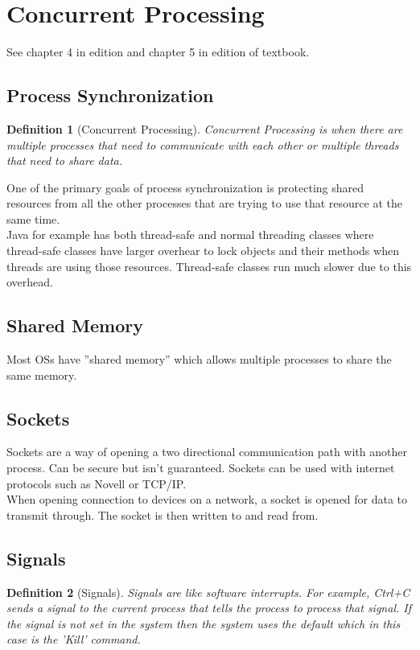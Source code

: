 \documentclass{report}
\newtheorem*{defn}{Definition}
\begin{document}
\section*{Concurrent Processing}
See chapter 4 in  edition and chapter 5 in  edition of textbook.\\

\subsection*{Process Synchronization}
\begin{defn}[Concurrent Processing] Concurrent Processing is when there are multiple processes that need to communicate with each other or multiple threads that need to share data.
\end{defn}
\noindent
One of the primary goals of process synchronization is protecting shared resources from all the other processes that are trying to use that resource at the same time.\\

Java for example has both thread-safe and normal threading classes where thread-safe classes have larger overhear to lock objects and their methods when threads are using those resources. Thread-safe classes run much slower due to this overhead.\\


\subsection*{Shared Memory}
Most OSs have ''shared memory'' which allows multiple processes to share the same memory.\\

\subsection*{Sockets}
Sockets are a way of opening a two directional communication path with another process. Can be secure but isn't guaranteed. Sockets can be used with internet protocols such as Novell or TCP/IP.\\

When opening connection to devices on a network, a socket is opened for data to transmit through. The socket is then written to and read from.\\

\subsection*{Signals}
\begin{defn}[Signals]Signals are like software interrupts. For example, Ctrl+C sends a signal to the current process that tells the process to process that signal. If the signal is not set in the system then the system uses the default which in this case is the 'Kill' command.
\end{defn}
\end{document}

